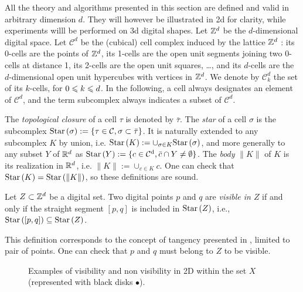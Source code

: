    All the theory and algorithms presented in this section are
    defined and valid in arbitrary dimension $d$. They will however be
    illustrated in 2d for clarity, while experiments willl be
    performed on 3d digital shapes.  Let $\mathbb{Z}^d$ be the $d$-dimensional
    digital space.  Let $\mathcal{C}^d$ be the (cubical) cell complex
    induced by the lattice $\mathbb{Z}^d$ : its 0-cells are the points of
    $\mathbb{Z}^d$, its 1-cells are the open unit segments joining two 0-cells
    at distance 1, its 2-cells are the open unit squares, \ldots, and
    its $d$-cells are the $d$-dimensional open unit hypercubes with
    vertices in $\mathbb{Z}^d$.  We denote by $\mathcal{C}^d_k$ the set of its
    $k$-cells, for $0 \leqslant k \leqslant d$.  In the following, a cell always
    designates an element of $\mathcal{C}^d$, and the term subcomplex
    always indicates a subset of $\mathcal{C}^d$.

    The \emph{topological closure} of a cell $\tau$ is denoted by
    $\bar{\tau}$. The \emph{star} of a cell $\sigma$ is the subcomplex
    $\mathrm{Star}\left(\sigma\right):=\{\tau \in \mathcal{C}, \sigma \subset \bar{\tau}
    \}$. It is naturally extended to any subcomplex $K$ by union,
    i.e. $\mathrm{Star}\left(K\right) := \cup_{\sigma \in K} \mathrm{Star}\left(\sigma\right)$, and more
    generally to any subset $Y$ of $\mathbb{R}^d$ as $\mathrm{Star}\left(Y\right):=\{ c \in \operatorname{\mathcal{C}^d},
    \bar{c} \cap Y \neq \emptyset \}$. The \emph{body} $\|K\|$ of $K$
    is its realization in $\mathbb{R}^d$, i.e. $\|K\|:=\cup_{c \in K} c$. One
    can check that $\mathrm{Star}\left(K\right)=\mathrm{Star}\left(\|K\|\right)$, so these definitions are
    sound.

    \begin{definition}[Visibility]
      Let $Z \subset \mathbb{Z}^d$ be a digital set. Two digital points $p$
      and $q$ are \emph{visible in $Z$} if and only if the straight
      segment $[p, q]$ is included in $\mathrm{Star}\left(Z\right)$, i.e., $\mathrm{Star}\left([p, q]\right)
      \subseteq \mathrm{Star}\left(Z\right)$.
    \end{definition}
    This definition corresponds to the concept of tangency presented
    in \cite{lachaud:2022-jmiv}, limited to pair of points. One can
    check that $p$ and $q$ must belong to $Z$ to be visible.
    
    \begin{figure}[t]
      \centering
      
      \caption{Examples of visibility and non visibility in 2D within
        the set $X$ (represented with black disks $\bullet$).}
      \label{fig:visibility-2d}
    \end{figure}


